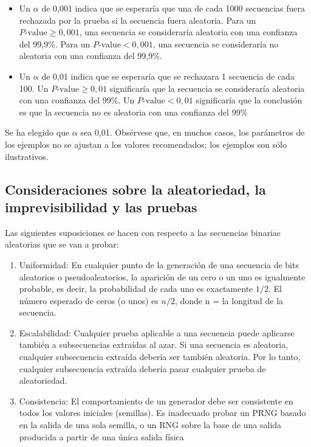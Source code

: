 \begin{itemize}
 \item Un $\alpha$ de 0,001 indica que se esperaría que una de cada 1000 secuencias fuera rechazada por la prueba si la secuencia fuera aleatoria. Para un $P\text{-value} \geq 0,001$, una secuencia se consideraría aleatoria con una confianza del 99,9\%. Para un $P\text{-value} < 0,001$, una secuencia se consideraría no aleatoria con una confianza del 99,9\%.
 
 \item Un $\alpha$ de 0,01 indica que se esperaría que se rechazara 1 secuencia de cada 100. Un $P\text{-value} \geq 0,01$ significaría que la secuencia se consideraría aleatoria con una confianza del 99\%. Un $P\text{-value} < 0,01$ significaría que la conclusión es que la secuencia no es aleatoria con una confianza del 99\%
\end{itemize}


Se ha elegido que $\alpha$ sea 0,01. Obsérvese que, en muchos casos, los parámetros de los ejemplos no se ajustan a los valores recomendados; los ejemplos son sólo ilustrativos.

	\subsection{Consideraciones sobre la aleatoriedad, la imprevisibilidad y las pruebas}
	
	Las siguientes suposiciones se hacen con respecto a las secuencias binarias aleatorias que se van a probar:
	
	\begin{enumerate}
		\item Uniformidad: En cualquier punto de la generación de una secuencia de bits aleatorios o pseudoaleatorios, la aparición de un cero o un uno es igualmente probable, es decir, la probabilidad de cada uno es exactamente $1/2$. El número esperado de ceros (o unos) es $n/2$, donde n = la longitud de la secuencia.
		\item Escalabilidad: Cualquier prueba aplicable a una secuencia puede aplicarse también a subsecuencias extraídas al azar. Si una secuencia es aleatoria, cualquier subsecuencia extraída debería ser también aleatoria. Por lo tanto, cualquier subsecuencia extraída debería pasar cualquier prueba de aleatoriedad.
		\item Consistencia: El comportamiento de un generador debe ser consistente en todos los valores iniciales (semillas). Es inadecuado probar un PRNG basado en la salida de una sola semilla, o un RNG sobre la base de una salida producida a partir de una única salida física
	\end{enumerate}
	
